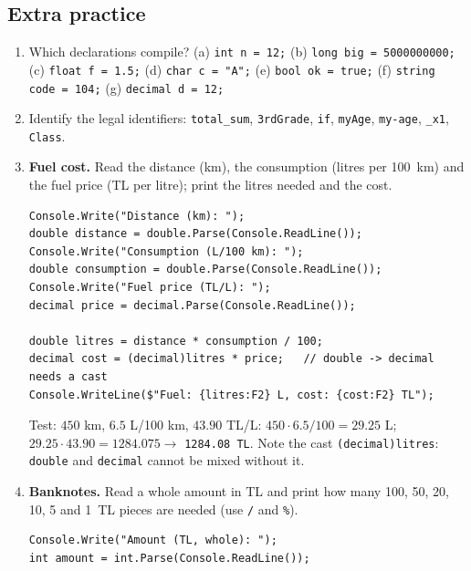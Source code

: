 \subsection{Extra practice}
\begin{enumerate}[label=\textbf{P\arabic*.},leftmargin=*,itemsep=1pt]
  \item {} Which declarations compile? (a) \texttt{int n = 12;} (b) \texttt{long big = 5000000000;} (c) \texttt{float f = 1.5;} (d) \texttt{char c = "A";} (e) \texttt{bool ok = true;} (f) \texttt{string code = 104;} (g) \texttt{decimal d = 12;}
  \item {} Identify the legal identifiers: \texttt{total\_sum}, \texttt{3rdGrade}, \texttt{if}, \texttt{myAge}, \texttt{my-age}, \texttt{\_x1}, \texttt{Class}.
  \item {} \textbf{Fuel cost.} Read the distance (km), the consumption (litres per 100~km) and the fuel price (TL per litre); print the litres needed and the cost.
  \ifsolutions\begin{solbox}\begin{lstlisting}[numbers=none]
Console.Write("Distance (km): ");
double distance = double.Parse(Console.ReadLine());
Console.Write("Consumption (L/100 km): ");
double consumption = double.Parse(Console.ReadLine());
Console.Write("Fuel price (TL/L): ");
decimal price = decimal.Parse(Console.ReadLine());

double litres = distance * consumption / 100;
decimal cost = (decimal)litres * price;   // double -> decimal needs a cast
Console.WriteLine($"Fuel: {litres:F2} L, cost: {cost:F2} TL");
\end{lstlisting}
 Test: $450$ km, $6.5$ L/100 km, $43.90$ TL/L: $450 \cdot 6.5/100 = 29.25$ L; $29.25 \cdot 43.90 = 1284.075 \to$ \texttt{1284.08 TL}. Note the cast \texttt{(decimal)litres}: \texttt{double} and \texttt{decimal} cannot be mixed without it.
\end{solbox}\fi
  \item {} \textbf{Banknotes.} Read a whole amount in TL and print how many 100, 50, 20, 10, 5 and 1~TL pieces are needed (use \texttt{/} and \texttt{\%}).
  \ifsolutions\begin{solbox}\begin{lstlisting}[numbers=none]
Console.Write("Amount (TL, whole): ");
int amount = int.Parse(Console.ReadLine());


\end{lstlisting}
\end{solbox}
\end{enumerate}
